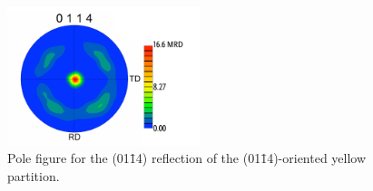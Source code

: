 \begin{figure}
\begin{center}
\includegraphics[width=0.5\textwidth]{yellow0114pole.pdf}
\caption[(01\={1}4) pole figure for yellow grains]{%
	Pole figure for the (01\={1}4) reflection of the (01\={1}4)-oriented yellow
partition.}
\label{fig:yellow0114pole}
\end{center}
\end{figure}
			
